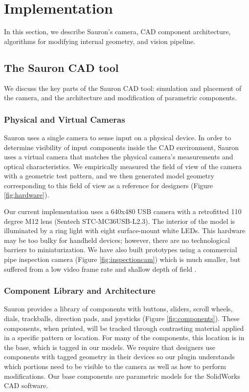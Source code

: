 \section{Implementation}

In this section, we describe Sauron's camera, CAD component architecture, algorithms for modifying internal geometry, and vision pipeline. 


    \subsection{The Sauron CAD tool}
     
     We discuss the key parts of the Sauron CAD tool: simulation and placement of the camera, and the architecture and modification of parametric components.
    

\subsubsection{Physical and Virtual Cameras}
Sauron uses a single camera to sense input on a physical device. In order to determine visibility of input components inside the CAD environment, Sauron uses a virtual camera that matches the physical camera's measurements and optical characteristics. We empirically measured the field of view of the camera with a geometric test pattern, and we then generated model geometry corresponding to this field of view as a reference for designers (Figure \ref{fig:hardware}).

Our current implementation uses a 640x480 USB camera with a retrofitted 110 degree M12 lens (Sentech STC-MC36USB-L2.3). The interior of the model is illuminated by a ring light with eight surface-mount white LEDs. This hardware may be too bulky for handheld devices; however, there are no technological barriers to miniaturization. We have also built prototypes using a commercial pipe inspection camera (Figure \ref{fig:inspectioncam}) which is much smaller, but suffered from a low video frame rate and shallow depth of field .


\subsubsection{Component Library and Architecture }
Sauron provides a library of components with buttons, sliders, scroll wheels, dials, trackballs, direction pads, and joysticks (Figure \ref{fig:components}). These components, when printed, will be tracked through contrasting material applied in a specific pattern or location. For many of the components, this location is in the base, which is tagged in our models. We require that designers use components with tagged geometry in their devices so our plugin understands which portions need to be visible to the camera as well as how to perform modifications. Our base components are parametric models for the SolidWorks CAD software.

